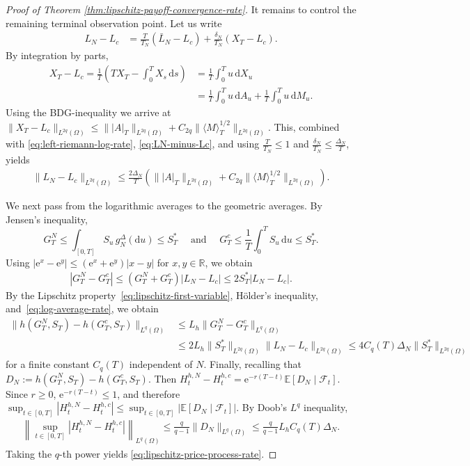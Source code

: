 \documentclass[10pt,a4paper,reqno]{amsart}
\theoremstyle{plain}
\theoremstyle{definition}
\theoremstyle{remark}
\theoremstyle{example}
\begin{document}
\begin{proof}[Proof of Theorem \ref{thm:lipschitz-payoff-convergence-rate}]
    It remains to control the remaining terminal observation point. Let us write 
    \begin{align}\label{eq:LN-minus-Lc}
        L_N-L_c &= \frac{T}{T_N}(\bar L_N-L_c) + \frac{\delta_N}{T_N}(X_T-L_c).
    \end{align}
    By integration by parts,
    \begin{align*}
        X_T-L_c = \frac1T \left( TX_T-\int_0^TX_s\,\mathrm ds \right)
        &= \frac1T\int_0^T u\,\mathrm dX_u 
        \\ &= \frac1T\int_0^T u\,\mathrm dA_u + \frac1T\int_0^T u\,\mathrm dM_u.
    \end{align*}
    Using the BDG-inequality we arrive at $\|X_T-L_c\|_{L^{2q}(\Omega)} \leq \big\||A|_T\big\|_{L^{2q}(\Omega)} + C_{2q} \big\|\langle M\rangle_T^{1/2}\big\|_{L^{2q}(\Omega)}$. This, combined with \eqref{eq:left-riemann-log-rate}, \eqref{eq:LN-minus-Lc}, and using $\frac{T}{T_N}\leq1$ and $\frac{\delta_N}{T_N} \leq \frac{\Delta_N}{T}$, yields
    \begin{align}\label{eq:log-average-rate}
        \|L_N-L_c\|_{L^{2q}(\Omega)} \leq \frac{2\Delta_N}{T} \left( \big\||A|_T\big\|_{L^{2q}(\Omega)} + C_{2q} \big\|\langle M\rangle_T^{1/2}\big\|_{L^{2q}(\Omega)} \right).
    \end{align}
    
    We next pass from the logarithmic averages to the geometric averages. By Jensen's inequality,
    \[
        G_T^N \leq \int_{[0,T]}S_u\,g_N^\Delta(\mathrm du) \leq S_T^*\quad \text{ and } \quad G_T^c \leq \frac1T\int_0^T S_u\,\mathrm du \leq S_T^*.
    \]
    Using $ |\mathrm e^x-\mathrm e^y| \leq (\mathrm e^x+\mathrm e^y)|x-y|$ for $x,y\in\mathbb R$, we obtain 
    \begin{align*}
        |G_T^N-G_T^c| \leq (G_T^N+G_T^c)|L_N-L_c| \leq 2S_T^*|L_N-L_c|.
    \end{align*}
    By the Lipschitz property~\eqref{eq:lipschitz-first-variable}, H\"older's inequality, and~\eqref{eq:log-average-rate}, we obtain
    \begin{align*}
        \|h(G_T^N,S_T)-h(G_T^c,S_T)\|_{L^q(\Omega)} &\leq L_h \|G_T^N-G_T^c\|_{L^q(\Omega)} 
        \\ &\leq 2L_h \|S_T^*\|_{L^{2q}(\Omega)}\|L_N-L_c\|_{L^{2q}(\Omega)} 
        \leq 4C_q(T) \Delta_N \|S_T^*\|_{L^{2q}(\Omega)}
    \end{align*}
    for a finite constant $C_q(T)$ independent of $N$. Finally, recalling that $D_N := h(G_T^N,S_T)-h(G_T^c,S_T)$. Then $H_t^{h,N}-H_t^{h,c} = \mathrm e^{-r(T-t)} \mathbb E[D_N\mid\mathcal F_t]$. Since $r\geq0$, $\mathrm e^{-r(T-t)}\leq1$, and therefore $\sup_{t\in[0,T]} |H_t^{h,N}-H_t^{h,c}| \leq \sup_{t\in[0,T]} \left| \mathbb E[D_N\mid\mathcal F_t] \right|$. By Doob's $L^q$ inequality,
    \begin{align*}
        \left\| \sup_{t\in[0,T]} |H_t^{h,N}-H_t^{h,c}| \right\|_{L^q(\Omega)} \leq \frac{q}{q-1} \|D_N\|_{L^q(\Omega)} \leq \frac{q}{q-1} L_h C_q(T)\Delta_N.
    \end{align*}
    Taking the $q$-th power yields \eqref{eq:lipschitz-price-process-rate}.
\end{proof}
\end{document}
